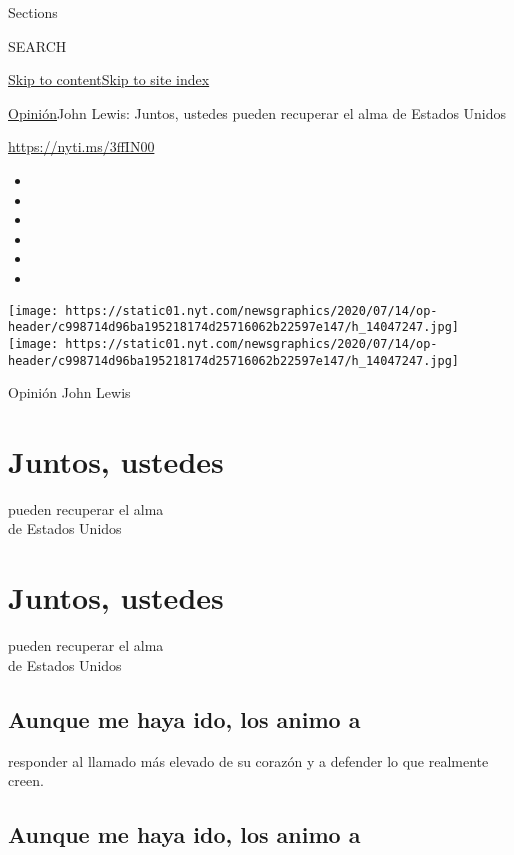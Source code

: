 Sections

SEARCH

\protect\hyperlink{site-content}{Skip to
content}\protect\hyperlink{site-index}{Skip to site index}

\href{/es/section/opinion}{Opinión}\textbar{}John Lewis: Juntos, ustedes
pueden recuperar el alma de Estados Unidos

\url{https://nyti.ms/3ffIN00}

\begin{itemize}
\item
\item
\item
\item
\item
\item
\end{itemize}

\texttt{[image: https://static01.nyt.com/newsgraphics/2020/07/14/op-header/c998714d96ba195218174d25716062b22597e147/h\_14047247.jpg]}
\texttt{[image: https://static01.nyt.com/newsgraphics/2020/07/14/op-header/c998714d96ba195218174d25716062b22597e147/h\_14047247.jpg]}

 Opinión John Lewis

\hypertarget{juntos-ustedes}{%
\section{Juntos, ustedes}\label{juntos-ustedes}}

pueden recuperar el alma\\
de Estados Unidos

\hypertarget{juntos-ustedes-1}{%
\section{Juntos, ustedes}\label{juntos-ustedes-1}}

pueden recuperar el alma\\
de Estados Unidos

\hypertarget{aunque-me-haya-ido-los-animo-a}{%
\subsection{Aunque me haya ido, los animo
a}\label{aunque-me-haya-ido-los-animo-a}}

responder al llamado más elevado de su corazón y a defender lo que
realmente creen.

\hypertarget{aunque-me-haya-ido-los-animo-a-1}{%
\subsection{Aunque me haya ido, los animo
a}\label{aunque-me-haya-ido-los-animo-a-1}}

